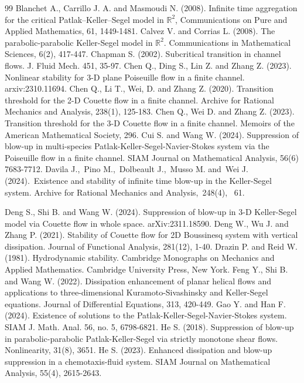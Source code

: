 \documentclass[12pt, reqno]{amsart}
\numberwithin{equation}{section}
\begin{document}
\begin{thebibliography}{99}
		 Blanchet A., Carrillo J. A. and Masmoudi N. (2008). Infinite time aggregation for the critical Patlak–Keller–Segel model in $\mathbb{R}^2$, Communications on Pure and Applied Mathematics, 61, 1449-1481.
		Calvez V. and Corrias L. (2008).
		The parabolic-parabolic Keller-Segel model in $\mathbb{R}^2$. Communications in Mathematical Sciences, 6(2), 417-447.
		 Chapman S. (2002). Subcritical transition in channel flows. J. Fluid Mech. 451, 35-97.
		Chen Q., Ding S., Lin Z. and Zhang Z. (2023). Nonlinear stability for 3-D plane Poiseuille flow in a finite channel. arxiv:2310.11694.
		Chen Q., Li T., Wei, D. and Zhang Z. (2020). Transition threshold for the 2-D Couette flow in a finite channel. Archive for Rational Mechanics and Analysis, 238(1), 125-183.
		Chen Q., Wei D. and Zhang Z. (2023). Transition threshold for the 3-D Couette flow in a finite channel. Memoirs of the American Mathematical Society, 296.
		 Cui S. and Wang W. (2024). Suppression of blow-up in multi-species Patlak-Keller-Segel-Navier-Stokes system via the Poiseuille flow in a finite channel.  SIAM Journal on Mathematical Analysis, 56(6) 7683-7712.
		 Davila J., Pino M., Dolbeault J., Musso M. and Wei J. (2024). Existence and stability of infinite time blow-up in the Keller-Segel system.  Archive for Rational Mechanics and Analysis, 248(4),  61.
		
		Deng S., Shi B. and Wang W. (2024).
		Suppression of blow-up in 3-D Keller-Segel model via Couette flow in whole space. arXiv:2311.18590.
		Deng W., Wu J. and Zhang P. (2021). Stability of Couette flow for 2D Boussinesq system with vertical dissipation. Journal of Functional Analysis, 281(12), 1-40.
		Drazin P. and Reid W. (1981). Hydrodynamic stability. Cambridge Monographs on Mechanics and Applied Mathematics. Cambridge University Press, New York.
		Feng Y., Shi B. and Wang W. (2022). Dissipation enhancement of planar helical flows and applications to three-dimensional Kuramoto-Sivashinsky and Keller-Segel equations. Journal of Differential Equations, 313, 420-449.
Gao Y. and Han F. (2024). Existence of solutions to the Patlak-Keller-Segel-Navier-Stokes system. SIAM J. Math. Anal. 56, no. 5, 6798-6821.
		He S. (2018). Suppression of blow-up in parabolic-parabolic Patlak-Keller-Segel via strictly monotone shear flows. Nonlinearity, 31(8), 3651.
		He S. (2023). Enhanced dissipation and blow-up suppression in a chemotaxis-fluid system. SIAM Journal on Mathematical Analysis, 55(4), 2615-2643.
		

\end{thebibliography}
\end{document}
